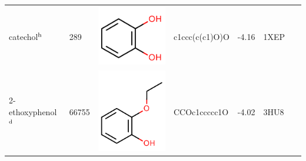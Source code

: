 \documentclass[aps,pre,twocolumn,nofootinbib,superscriptaddress,10pt, final,tightenlines]{revtex4-1}
\begin{document}
\begin{table}
\begin{center}
\begin{tabular}{llp{2cm}>{\ttfamily}lS[table-format=-1.2, table-figures-uncertainty=1]ll}
catechol$^{\rm h}$                 & 289                                  & \parbox[c]{1em}{\includegraphics[scale=0.2]{figures/289.pdf}}      & c1ccc(c(c1)O)O                       & -4.16                                            & 1XEP~\cite{graves_decoys_2005}    & \cite{wei_model_2002}         \\ %
2-ethoxyphenol$^{\rm d}$           & 66755                                & \parbox[c]{1em}{\includegraphics[scale=0.2]{figures/66755.pdf}}    & CCOc1ccccc1O                         & -4.02                                            & 3HU8~\cite{boyce_predicting_2009} & \cite{boyce_predicting_2009}  \\%

\end{tabular}
\end{center}
\end{table}
\end{document}
